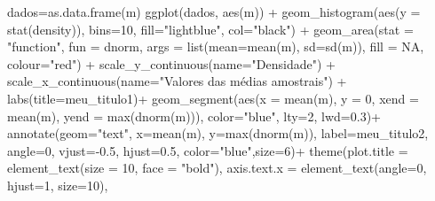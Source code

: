 \documentclass[
]{book}
\newenvironment{Shaded}{\begin{snugshade}}{\end{snugshade}}
\newcommand{\AttributeTok}[1]{\textcolor[rgb]{0.77,0.63,0.00}{#1}}
\newcommand{\ConstantTok}[1]{\textcolor[rgb]{0.00,0.00,0.00}{#1}}
\newcommand{\DecValTok}[1]{\textcolor[rgb]{0.00,0.00,0.81}{#1}}
\newcommand{\FloatTok}[1]{\textcolor[rgb]{0.00,0.00,0.81}{#1}}
\newcommand{\FunctionTok}[1]{\textcolor[rgb]{0.00,0.00,0.00}{#1}}
\newcommand{\NormalTok}[1]{#1}
\newcommand{\OtherTok}[1]{\textcolor[rgb]{0.56,0.35,0.01}{#1}}
\newcommand{\SpecialCharTok}[1]{\textcolor[rgb]{0.00,0.00,0.00}{#1}}
\newcommand{\StringTok}[1]{\textcolor[rgb]{0.31,0.60,0.02}{#1}}
\begin{document}
\begin{Shaded}
\begin{Highlighting}[]
\NormalTok{dados}\OtherTok{=}\FunctionTok{as.data.frame}\NormalTok{(m)}
\FunctionTok{ggplot}\NormalTok{(dados, }\FunctionTok{aes}\NormalTok{(m)) }\SpecialCharTok{+}     
  \FunctionTok{geom\_histogram}\NormalTok{(}\FunctionTok{aes}\NormalTok{(}\AttributeTok{y =} \FunctionTok{stat}\NormalTok{(density)), }\AttributeTok{bins=}\DecValTok{10}\NormalTok{, }\AttributeTok{fill=}\StringTok{"lightblue"}\NormalTok{, }\AttributeTok{col=}\StringTok{"black"}\NormalTok{) }\SpecialCharTok{+}
  \FunctionTok{geom\_area}\NormalTok{(}\AttributeTok{stat =} \StringTok{"function"}\NormalTok{, }
            \AttributeTok{fun =}\NormalTok{ dnorm, }
            \AttributeTok{args =} \FunctionTok{list}\NormalTok{(}\AttributeTok{mean=}\FunctionTok{mean}\NormalTok{(m), }\AttributeTok{sd=}\FunctionTok{sd}\NormalTok{(m)),}
            \AttributeTok{fill =} \ConstantTok{NA}\NormalTok{, }
            \AttributeTok{colour=}\StringTok{"red"}\NormalTok{) }\SpecialCharTok{+}
  \FunctionTok{scale\_y\_continuous}\NormalTok{(}\AttributeTok{name=}\StringTok{"Densidade"}\NormalTok{) }\SpecialCharTok{+}
  \FunctionTok{scale\_x\_continuous}\NormalTok{(}\AttributeTok{name=}\StringTok{"Valores das médias amostrais"}\NormalTok{) }\SpecialCharTok{+}
  \FunctionTok{labs}\NormalTok{(}\AttributeTok{title=}\NormalTok{meu\_titulo1)}\SpecialCharTok{+}
  \FunctionTok{geom\_segment}\NormalTok{(}\FunctionTok{aes}\NormalTok{(}\AttributeTok{x =} \FunctionTok{mean}\NormalTok{(m), }\AttributeTok{y =} \DecValTok{0}\NormalTok{, }\AttributeTok{xend =} \FunctionTok{mean}\NormalTok{(m), }\AttributeTok{yend =} \FunctionTok{max}\NormalTok{(}\FunctionTok{dnorm}\NormalTok{(m))), }\AttributeTok{color=}\StringTok{"blue"}\NormalTok{, }\AttributeTok{lty=}\DecValTok{2}\NormalTok{, }\AttributeTok{lwd=}\FloatTok{0.3}\NormalTok{)}\SpecialCharTok{+}
  \FunctionTok{annotate}\NormalTok{(}\AttributeTok{geom=}\StringTok{"text"}\NormalTok{, }\AttributeTok{x=}\FunctionTok{mean}\NormalTok{(m), }\AttributeTok{y=}\FunctionTok{max}\NormalTok{(}\FunctionTok{dnorm}\NormalTok{(m)),}
           \AttributeTok{label=}\NormalTok{meu\_titulo2, }\AttributeTok{angle=}\DecValTok{0}\NormalTok{, }\AttributeTok{vjust=}\SpecialCharTok{{-}}\FloatTok{0.5}\NormalTok{, }\AttributeTok{hjust=}\FloatTok{0.5}\NormalTok{, }\AttributeTok{color=}\StringTok{"blue"}\NormalTok{,}\AttributeTok{size=}\DecValTok{6}\NormalTok{)}\SpecialCharTok{+}
  \FunctionTok{theme}\NormalTok{(}\AttributeTok{plot.title =} \FunctionTok{element\_text}\NormalTok{(}\AttributeTok{size =} \DecValTok{10}\NormalTok{, }\AttributeTok{face =} \StringTok{"bold"}\NormalTok{),}
        \AttributeTok{axis.text.x =} \FunctionTok{element\_text}\NormalTok{(}\AttributeTok{angle=}\DecValTok{0}\NormalTok{, }\AttributeTok{hjust=}\DecValTok{1}\NormalTok{, }\AttributeTok{size=}\DecValTok{10}\NormalTok{),}

\end{Highlighting}
\end{Shaded}
\end{document}
